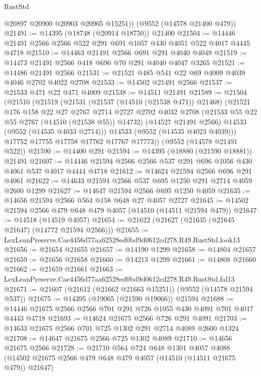 \begin{lexlean}{RustStd}
\begin{coremodule}
        @20897
        @20900
        @20903
        @20905
        @15251))
    (@9552 (@14578 @21400 @479))
@21491 := @14395 (@18748 (@20914 @18750)) @21400
@21504 := @14446 @21491 @2566 @2566 @522 @291 @691 @1057 @430 @4051 @522 @4017 @4445 @4718
@21510 := @14463 @21491 @2566 @691 @291 @4040 @4049
@21519 := @14473 @21491 @2566 @418 @690 @70 @291 @4040 @4047 @3265
@21521 := @14486 @21491 @2566
@21531 := @21521 @485 @541 @22 @69 @4009 @4039 @4046 @2702 @4022 @2708
@21533 := @14502 @21491 @2566
@21537 := @21533 @471 @22 @471 @4009
@21538 := @14511 @21491
@21589 := @21504
    (@21510
      (@21519
        (@21531
          (@21537 (@14510 (@21538 @471)) @21468)
          (@21521
            @176
            @158
            @22
            @27
            @2767
            @2714
            @2727
            @2702
            @4032
            @2708
            (@21533 @55 @22 @55 @2767 (@14510 (@21538 @55)) @14732)
            (@14527 @21491 @2566)
            @14533
            (@9552 (@14535 @4033 @2714)))
          @14533
          (@9552 (@14535 @4023 @4039)))
        @17752
        @17755
        @17758
        @17762
        @17767
        @17773))
    (@9552 (@14578 @21491 @522))
@21590 := @14400 @291
@21594 := @14395 (@18880 (@21590 @18881)) @21491
@21607 := @14446 @21594 @2566 @2566 @537 @291 @696 @1056 @430 @4061 @537 @4017 @4444 @4718
@21612 := @14624 @21594 @2566 @696 @291 @4061
@21622 := @14633 @21594 @2566 @537 @695 @1250 @291 @2714 @4059 @2600 @1299
@21627 := @14647 @21594 @2566 @695 @1250 @4059
@21635 := @14656 @21594 @2566 @564 @158 @648 @27 @4057 @2727
@21645 := @14502 @21594 @2566 @479 @648 @479 @4057 (@14510 (@14511 @21594 @479))
@21647 := @14518 (@14519 @4057)
@21654 := @21622 (@21627 (@21635 (@21645 @21647) (@14772 @21594 @2566)))
@21655 := LexLeanPreserve.Cae4456d77aa62528ed0bd9d0612cd278.R49.RustStd.look13
@21656 := @21654 @21655
@21657 := @14190 @1299
@21658 := @14804 @21657
@21659 := @21656 @21658
@21660 := @14213 @1299
@21661 := @14808 @21660
@21662 := @21659 @21661
@21663 := LexLeanPreserve.Cae4456d77aa62528ed0bd9d0612cd278.R49.RustStd.fal13
@21671 := @21607 (@21612 (@21662 @21663 @15251)) (@9552 (@14578 @21594 @537))
@21675 := @14395 (@19065 (@21590 @19066)) @21594
@21688 := @14446 @21675 @2566 @2566 @701 @291 @726 @1055 @430 @4091 @701 @4017 @4443 @4718
@21693 := @14624 @21675 @2566 @726 @291 @4091
@21703 := @14633 @21675 @2566 @701 @725 @1302 @291 @2714 @4089 @2600 @1324
@21708 := @14647 @21675 @2566 @725 @1302 @4089
@21710 := @14656 @21675 @2566
@21728 := @21710
    @564
    @724
    @648
    @1301
    @4057
    @4088
    (@14502 @21675 @2566 @479 @648 @479 @4057 (@14510 (@14511 @21675 @479)) @21647)

\end{coremodule}
\end{lexlean}
